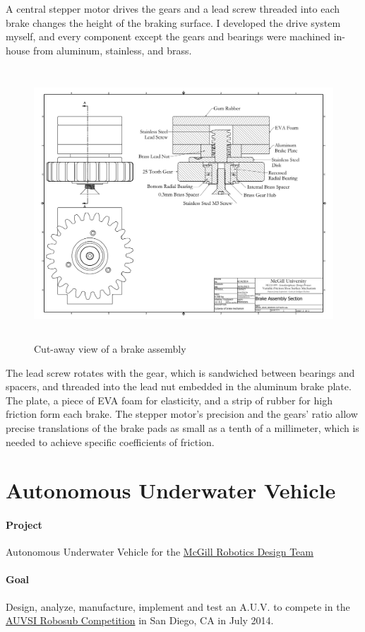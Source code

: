 \documentclass[12pt, landscape]{article}
\begin{document}
		A central stepper motor drives the gears and a lead screw threaded into each brake changes the height of the braking surface.  I developed the drive system myself, and every component except the gears and bearings were machined in-house from aluminum, stainless, and brass.

		\begin{figure}[H]
			\centering
			\includegraphics[height=4in]{media/cutaway}
			\caption{Cut-away view of a brake assembly}
			\label{cutaway}
		\end{figure}

		The lead screw rotates with the gear, which is sandwiched between bearings and spacers, and threaded into the lead nut embedded in the aluminum brake plate.  The plate, a piece of EVA foam for elasticity, and a strip of rubber for high friction form each brake.  The stepper motor's precision and the gears' ratio allow precise translations of the brake pads as small as a tenth of a millimeter, which is needed to achieve specific coefficients of friction.

\clearpage

	\section{Autonomous Underwater Vehicle}
		\paragraph{Project} Autonomous Underwater Vehicle for the \href{http://www.mcgillrobotics.com}{McGill Robotics Design Team}
		\paragraph{Goal} Design, analyze, manufacture, implement and test an A.U.V. to compete in the \href{http://www.robosub.org}{AUVSI Robosub Competition} in San Diego, CA in July 2014.
\end{document}
